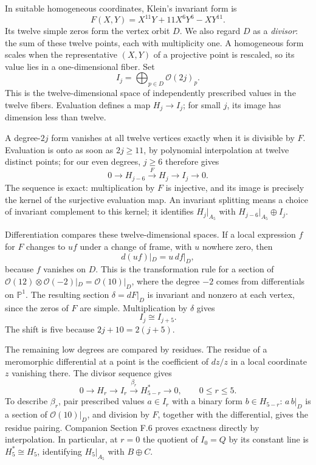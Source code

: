 \documentclass[11pt,a4paper]{article}
\begin{document}
In suitable homogeneous coordinates, Klein's invariant form is
\begin{equation}\label{eq:klein-cut}
F(X,Y)=X^{11}Y+11X^6Y^6-XY^{11}.
\end{equation}
Its twelve simple zeros form the vertex orbit $D$. We also regard $D$ as a \emph{divisor}: the sum of these twelve points, each with multiplicity one. A homogeneous form scales when the representative $(X,Y)$ of a projective point is rescaled, so its value lies in a one-dimensional fiber. Set
\[
I_j=\bigoplus_{p\in D}\mathcal O(2j)_p.
\]
This is the twelve-dimensional space of independently prescribed values in the twelve fibers. Evaluation defines a map $H_j\to I_j$; for small $j$, its image has dimension less than twelve.

A degree-$2j$ form vanishes at all twelve vertices exactly when it is divisible by $F$. Evaluation is onto as soon as $2j\geq11$, by polynomial interpolation at twelve distinct points; for our even degrees, $j\geq6$ therefore gives
\[
0\longrightarrow H_{j-6}\xrightarrow{\,F\,}H_j
\longrightarrow I_j\longrightarrow0.
\]
The sequence is exact: multiplication by $F$ is injective, and its image is precisely the kernel of the surjective evaluation map. An invariant splitting means a choice of invariant complement to this kernel; it identifies \(H_j|_{A_5}\) with \(H_{j-6}|_{A_5}\oplus I_j\).

Differentiation compares these twelve-dimensional spaces. If a local expression $f$ for $F$ changes to $uf$ under a change of frame, with $u$ nowhere zero, then
\[
d(uf)|_D=u\,df|_D,
\]
because $f$ vanishes on $D$. This is the transformation rule for a section of $\mathcal O(12)\otimes\mathcal O(-2)|_D=\mathcal O(10)|_D$, where the degree $-2$ comes from differentials on $\mathbb P^1$. The resulting section $\delta=dF|_D$ is invariant and nonzero at each vertex, since the zeros of $F$ are simple. Multiplication by $\delta$ gives
\begin{equation}\label{eq:period-five-cut}
I_j\cong I_{j+5}.
\end{equation}
The shift is five because $2j+10=2(j+5)$.

The remaining low degrees are compared by residues. The residue of a meromorphic differential at a point is the coefficient of $dz/z$ in a local coordinate $z$ vanishing there. The divisor sequence gives
\[
0\longrightarrow H_r\longrightarrow I_r
\xrightarrow{\,\beta_r\,}H_{5-r}^{*}\longrightarrow0,
\qquad 0\leq r\leq5.
\]
To describe $\beta_r$, pair prescribed values $a\in I_r$ with a binary form $b\in H_{5-r}$: \(a\,b|_D\) is a section of \(\mathcal O(10)|_D\), and division by \(F\), together with the differential, gives the residue pairing. Companion Section F.6 proves exactness directly by interpolation. In particular, at $r=0$ the quotient of $I_0=Q$ by its constant line is $H_5^*\cong H_5$, identifying $H_5|_{A_5}$ with $B\oplus C$.
\end{document}
